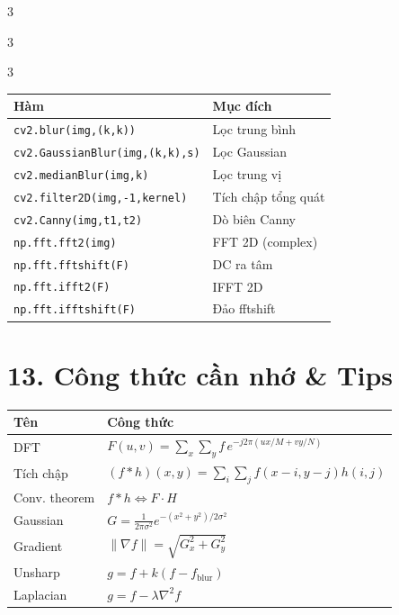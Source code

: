 \documentclass[9pt,landscape,a4paper]{extarticle}
\begin{document}
\begin{multicols*}{3}
\begin{multicols*}{3}
\begin{multicols}{3}
\begin{center}\scriptsize
\begin{tabular}{@{}ll@{}}
\toprule
Hàm & Mục đích \\
\midrule
\texttt{cv2.blur(img,(k,k))} & Lọc trung bình \\
\texttt{cv2.GaussianBlur(img,(k,k),s)} & Lọc Gaussian \\
\texttt{cv2.medianBlur(img,k)} & Lọc trung vị \\
\texttt{cv2.filter2D(img,-1,kernel)} & Tích chập tổng quát \\
\texttt{cv2.Canny(img,t1,t2)} & Dò biên Canny \\
\texttt{np.fft.fft2(img)} & FFT 2D (complex) \\
\texttt{np.fft.fftshift(F)} & DC ra tâm \\
\texttt{np.fft.ifft2(F)} & IFFT 2D \\
\texttt{np.fft.ifftshift(F)} & Đảo fftshift \\
\bottomrule
\end{tabular}
\end{center}

\section{13. Công thức cần nhớ \& Tips}

\begin{center}\scriptsize
\begin{tabular}{@{}ll@{}}
\toprule
Tên & Công thức \\
\midrule
DFT & $F(u,v) = \sum_x\sum_y f\,e^{-j2\pi(ux/M+vy/N)}$ \\
Tích chập & $(f*h)(x,y)=\sum_i\sum_j f(x{-}i,y{-}j)h(i,j)$ \\
Conv. theorem & $f*h \Leftrightarrow F\cdot H$ \\
Gaussian & $G=\frac{1}{2\pi\sigma^2}e^{-(x^2+y^2)/2\sigma^2}$ \\
Gradient & $\|\nabla f\|=\sqrt{G_x^2+G_y^2}$ \\
Unsharp & $g=f+k(f-f_\text{blur})$ \\
Laplacian & $g=f-\lambda\nabla^2 f$ \\
\bottomrule
\end{tabular}
\end{center}


\end{multicols}
\end{multicols*}
\end{multicols*}
\end{document}

